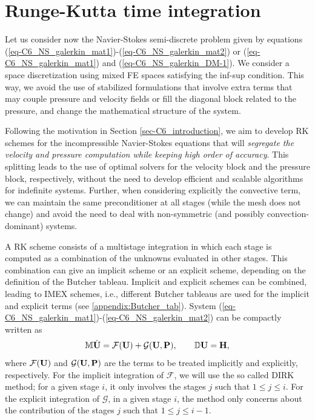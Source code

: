 \section{Runge-Kutta time integration}
\label{sec-C6_SRK_developement}
Let us consider now the Navier-Stokes semi-discrete problem given by equations (\ref{eq-C6_NS_galerkin_mat1})-(\ref{eq-C6_NS_galerkin_mat2}) or  (\ref{eq-C6_NS_galerkin_mat1})        and  (\ref{eq-C6_NS_galerkin_DM-1}). We consider a space discretization using mixed FE spaces satisfying the inf-sup condition. This way, we avoid the use of stabilized formulations that involve extra terms that may couple pressure and velocity fields or fill the diagonal block related to the pressure, and change the mathematical structure of the system.

Following the motivation in Section \ref{sec-C6_introduction}, we aim to develop RK schemes for the incompressible Navier-Stokes equations that will \emph{segregate the velocity and pressure computation while keeping high order of accuracy}. This splitting leads to the use of optimal solvers for the velocity block and the pressure block, respectively, without the need to develop efficient and scalable algorithms for indefinite systems. Further, when considering explicitly the convective term, we can maintain the same preconditioner at all stages (while the mesh does not change) and avoid the need to deal with non-symmetric (and possibly convection-dominant) systems. 

A RK scheme consists of a multistage integration in which each stage is computed as a combination of the unknowns evaluated in other stages. This combination can give an implicit scheme or an explicit scheme, depending on the definition of the Butcher tableau. Implicit and explicit schemes can be combined, leading to IMEX schemes, i.e., different Butcher tableaus are used for the implicit and explicit terms (see \ref{appendix:Butcher_tab}). System (\ref{eq-C6_NS_galerkin_mat1})-(\ref{eq-C6_NS_galerkin_mat2}) can be compactly written as
\begin{equation}
\label{eq-C6_NS_galerkin_mat1_ope}
\mathbb{M}\dot{{\bf U}}=\mathcal{F}({\bf U})+\mathcal{G}({\bf U},{\bf P}), \qquad \mathbb{D} {\bf U} = \bf{H},
\end{equation}
where $\mathcal{F}({\bf U})$  and $\mathcal{G}({\bf U},{\bf P})$ are the terms to be treated implicitly and explicitly, respectively. 
For the implicit integration of $\mathcal{F}$, we will use the so called DIRK method; for a given stage $i$, it only involves the stages $j$ such that $1\leq j\leq i$. For the explicit integration of $\mathcal{G}$, in a given stage $i$, the method only concerns about the contribution of the stages $j$ such that $1\leq j\leq i-1$. 

